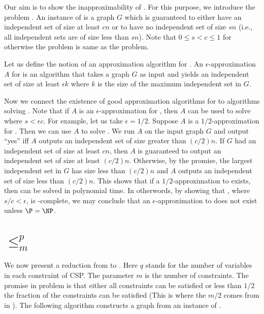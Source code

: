 \documentclass[11pt]{article}
\begin{document}


Our aim is to show the inapproximability of . For this 
purpose, we introduce the problem . An instance 
of  is a graph $G$ which is guaranteed to either 
have an independent set of size at least $cn$ or to have no independent 
set of size $sn$ (i.e., all independent sets are of size less than $sn$). 
Note that $0 \leq s < c \leq 1$ 
for otherwise the problem is same as the  problem. 

Let us define the notion of an approximation algorithm for . 
An $\epsilon$-approximation $A$ for  is an algorithm that 
takes a graph $G$ as input and yields an independent set of size at least 
$\epsilon k$ where $k$ is the size  of the maximum independent set in $G$. 

Now we connect the existence of good approximation algorithms for 
 to algorithms solving . Note that if 
$A$ is an $\epsilon$-approximation for , then $A$ can be 
used to solve  where $s < \epsilon c$. For example, let 
us take $\epsilon = 1/2$. Suppose $A$ is a $1/2$-approximation for 
. Then we can use $A$ to solve . We 
run $A$ on the input graph $G$ and output ``yes'' iff $A$ outputs an independent 
set of size greater than $(c/2)n$. If $G$ had an independent set of size at least 
$cn$, then $A$ is guaranteed to output an independent set of size at least $(c/2)n$. 
Otherwise, by the promise, the largest independent set in $G$ has size less than $(c/2)n$ 
and $A$ outputs an independent set of size less than $(c/2)n$. This shows that if a 
$1/2$-approximation to  exists, then  can be solved in 
polynomial time. In otherwords, by showing that , where $s/c < \epsilon$, 
is \NP-complete, we may conclude that an $\epsilon$-approximation to  does not 
exist unless $\P = \NP$.

\section{ $\leq_{m}^{p}$ }
We now present a reduction from  to . Here $q$ stands for the 
number of variables in each constraint of CSP. The parameter $m$ is the number of constraints. 
The promise in  problem is that either all constraints can be satisfied or less than 
$1/2$ the fraction of the constraints can be satisfied (This is where the $m/2$ comes from in ).
The following algorithm constructs a graph from an instance of .
\end{document}
